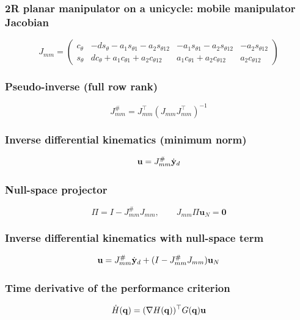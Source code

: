 \subsubsection{2R planar manipulator on a unicycle: mobile manipulator Jacobian}
\begin{equation*}
    J_{mm}=\begin{pmatrix}
    c_\theta&-ds_\theta-a_1s_{\theta1}-a_2s_{\theta12}&-a_1s_{\theta1}-a_2s_{\theta12}&-a_2s_{\theta12}\\
    s_\theta&dc_\theta+a_1c_{\theta1}+a_2c_{\theta12}&a_1c_{\theta1}+a_2c_{\theta12}&a_2c_{\theta12}
    \end{pmatrix}
\end{equation*}

\subsubsection{Pseudo-inverse (full row rank)}
\begin{equation*}
    J_{mm}^\#=J_{mm}^\top(J_{mm}J_{mm}^\top)^{-1}
\end{equation*}

\subsubsection{Inverse differential kinematics (minimum norm)}
\begin{equation*}
    \mathbf u=J_{mm}^\#{\dot{\mathbf y}}_d
\end{equation*}

\subsubsection{Null-space projector}
\begin{equation*}
    \Pi=I-J_{mm}^\#J_{mm},\qquad J_{mm}\Pi\mathbf u_N=\mathbf 0
\end{equation*}

\subsubsection{Inverse differential kinematics with null-space term}
\begin{equation*}
    \mathbf u=J_{mm}^\#{\dot{\mathbf y}}_d+(I-J_{mm}^\#J_{mm})\mathbf u_N
\end{equation*}

\subsubsection{Time derivative of the performance criterion}
\begin{equation*}
    \dot H({\mathbf q})=(\nabla H({\mathbf q}))^\top G({\mathbf q})\mathbf u
\end{equation*}

